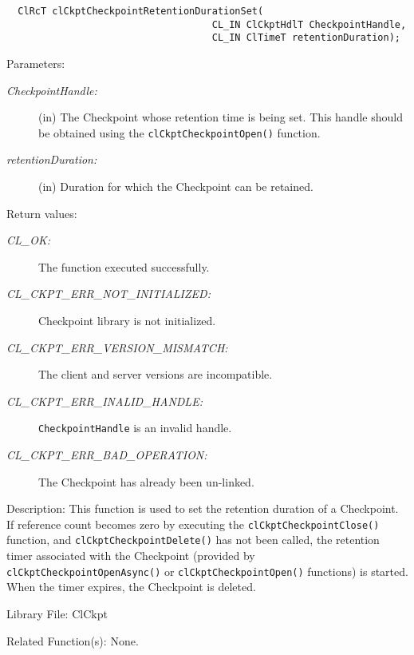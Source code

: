 \begin{flushleft}
\begin{Desc}
\footnotesize\begin{verbatim}  ClRcT clCkptCheckpointRetentionDurationSet(
                              		CL_IN ClCkptHdlT CheckpointHandle,
                              		CL_IN ClTimeT retentionDuration);
\end{verbatim}
\normalsize
\end{Desc}
\begin{Desc}
\item[Parameters:]
\begin{description}
\item[{\em Checkpoint\-Handle:}](in) The Checkpoint whose retention time is being set. This handle should be obtained using the 
{\tt{clCkptCheckpointOpen()}} function. \item[{\em retention\-Duration:}](in) Duration for which the Checkpoint can be 
retained.\end{description}
\end{Desc}
\begin{Desc}
\item[Return values:]
\begin{description}
\item[{\em CL\_\-OK:}]The function executed successfully.
\item[{\em CL\_\-CKPT\_\-ERR\_\-NOT\_\-INITIALIZED:}]Checkpoint library is not initialized. 
\item[{\em CL\_\-CKPT\_\-ERR\_\-VERSION\_\-MISMATCH:}]The client and server versions are incompatible.
\item[{\em CL\_\-CKPT\_\-ERR\_\-INALID\_\-HANDLE:}]{\tt{CheckpointHandle}} is an invalid handle.
 \item[{\em CL\_\-CKPT\_\-ERR\_\-BAD\_\-OPERATION:}]The Checkpoint has already been un-linked.
\end{description}
\end{Desc}
\begin{Desc}
\item[Description:]This function is used to set the retention duration of a Checkpoint. If reference count becomes zero by executing the {\tt{clCkptCheckpointClose()}} function, and {\tt{clCkptCheckpointDelete()}} has not been called, the retention timer associated with the 
Checkpoint (provided by {\tt{clCkptCheckpointOpenAsync()}} or {\tt{clCkptCheckpointOpen()}} functions) is started.
When the timer expires, the Checkpoint is deleted.\end{Desc}
\begin{Desc}
\item[Library File:]Cl\-Ckpt\end{Desc}
\begin{Desc}
\item[Related Function(s):]None. \end{Desc}
\newpage



\end{flushleft}
